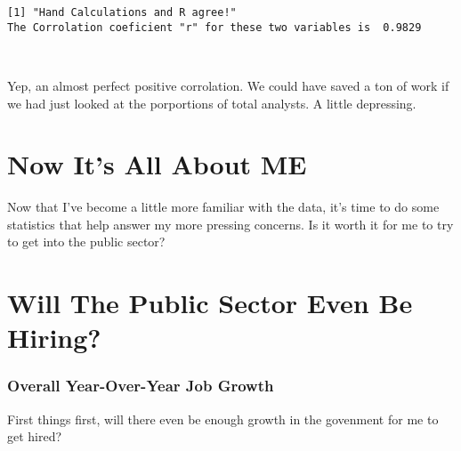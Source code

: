 \documentclass[11pt]{article}
\begin{document}
    \begin{Verbatim}[commandchars=\\\{\}]
[1] "Hand Calculations and R agree!"
The Corrolation coeficient "r" for these two variables is  0.9829
    \end{Verbatim}

    \begin{center}
    \end{center}
    { \hspace*{\fill} \\}
    
    Yep, an almost perfect positive corrolation. We could have saved a ton
of work if we had just looked at the porportions of total analysts. A
little depressing.

    \hypertarget{now-its-all-about-me}{%
\section{Now It's All About ME}\label{now-its-all-about-me}}

Now that I've become a little more familiar with the data, it's time to
do some statistics that help answer my more pressing concerns. Is it
worth it for me to try to get into the public sector?

    \hypertarget{will-the-public-sector-even-be-hiring}{%
\section{Will The Public Sector Even Be
Hiring?}\label{will-the-public-sector-even-be-hiring}}

\hypertarget{overall-year-over-year-job-growth}{%
\subsubsection{Overall Year-Over-Year Job
Growth}\label{overall-year-over-year-job-growth}}

First things first, will there even be enough growth in the govenment
for me to get hired?
\end{document}
